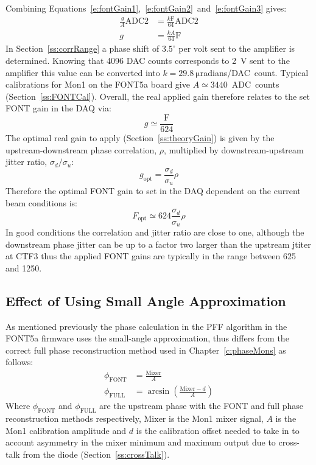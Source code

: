 Combining Equations~\ref{e:fontGain1},~\ref{e:fontGain2}~and~\ref{e:fontGain3} gives:
\begin{align}
\frac{g}{A}\mathrm{ADC2} &= \frac{k\mathrm{F}}{64}\mathrm{ADC2} \nonumber \\
g &= \frac{kA}{64}\mathrm{F} \label{e:fontGain4}
\end{align}
In Section~\ref{ss:corrRange} a phase shift of \(3.5^\circ\) per volt sent to the amplifier is determined. Knowing that 4096 DAC counts corresponds to 2~V sent to the amplifier this value can be converted into \(k = 29.8~\mathrm{\mu}\)radians/DAC~count. Typical calibrations for Mon1 on the FONT5a board give \(A \simeq 3440\)~ADC~counts (Section~\ref{ss:FONTCal}). Overall, the real applied gain therefore relates to the set FONT gain in the DAQ via:
\begin{equation}
g \simeq \frac{\mathrm{F}}{624}
\end{equation}
The optimal real gain to apply (Section~\ref{ss:theoryGain}) is given by the upstream-downstream phase correlation, \(\rho\), multiplied by downstream-upstream jitter ratio, \(\sigma_{d}/\sigma_{u}\):
\begin{equation}
g_{\mathrm{opt}} = \frac{\sigma_{d}}{\sigma_{u}} \rho  
\end{equation}
Therefore the optimal FONT gain to set in the DAQ dependent on the current beam conditions is:
\begin{equation}
F_{\mathrm{opt}} \simeq 624 \frac{\sigma_{d}}{\sigma_{u}} \rho
\label{e:fontOptGain}
\end{equation}
In good conditions the correlation and jitter ratio are close to one, although the downstream phase jitter can be up to a factor two larger than the upstream jtiter at CTF3 thus the applied FONT gains are typically in the range between 625 and 1250.

\subsection{Effect of Using Small Angle Approximation}
\label{ss:fontSmallAng}

As mentioned previously the phase calculation in the PFF algorithm in the FONT5a firmware uses the small-angle approximation, thus differs from the correct full phase reconstruction method used in Chapter~\ref{c:phaseMons} as follows:
\begin{align}
\phi_{\mathrm{FONT}} &= \frac{\mathrm{Mixer}}{A} \\
\phi_{\mathrm{FULL}} &= \arcsin\left(\frac{\mathrm{Mixer}-d}{A}\right)
\end{align}
Where \(\phi_{\mathrm{FONT}}\) and \(\phi_{\mathrm{FULL}}\) are the upstream phase with the FONT and full phase reconstruction methods respectively, \(\mathrm{Mixer}\) is the Mon1 mixer signal, \(A\) is the Mon1 calibration amplitude and \(d\) is the calibration offset needed to take in to account asymmetry in the mixer minimum and maximum output due to cross-talk from the diode (Section~\ref{ss:crossTalk}).


